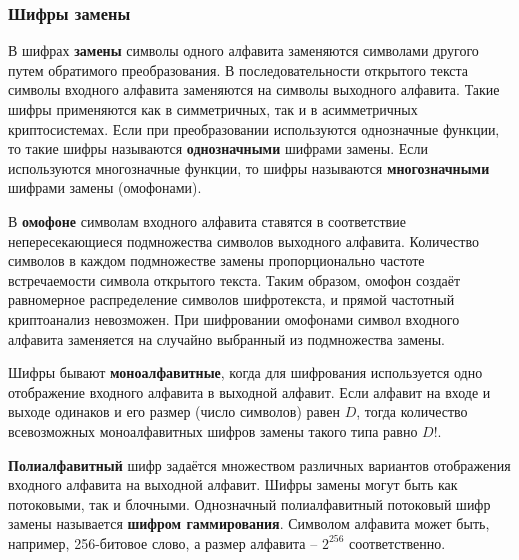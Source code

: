 \subsubsection{Шифры замены}

В шифрах \textbf{замены} символы одного алфавита заменяются символами другого путем обратимого преобразования. В последовательности открытого текста символы входного алфавита заменяются на символы выходного алфавита. Такие шифры применяются как в симметричных, так и в асимметричных криптосистемах. Если при преобразовании используются однозначные функции, то такие шифры называются \textbf{однозначными} шифрами замены. Если используются многозначные функции, то шифры называются \textbf{многозначными} шифрами замены (омофонами).

В \textbf{омофоне} символам входного алфавита ставятся в соответствие непересекающиеся подмножества символов выходного алфавита. Количество символов в каждом подмножестве замены пропорционально частоте встречаемости символа открытого текста. Таким образом, омофон создаёт равномерное распределение символов шифротекста, и прямой частотный криптоанализ невозможен. При шифровании омофонами символ входного алфавита заменяется на случайно выбранный из подмножества замены.

Шифры бывают \textbf{моноалфавитные}, когда для шифрования используется одно отображение входного алфавита в выходной алфавит. Если алфавит на входе и выходе одинаков и его размер (число символов) равен $D$, тогда количество всевозможных моноалфавитных шифров замены такого типа равно $D!$.

\textbf{Полиалфавитный} шифр задаётся множеством различных вариантов отображения входного алфавита на выходной алфавит. Шифры замены могут быть как потоковыми, так и блочными. Однозначный полиалфавитный потоковый шифр замены называется \textbf{шифром гаммирования}. Символом алфавита может быть, например, 256-битовое слово, а размер алфавита – $2^{256}$ соответственно.
